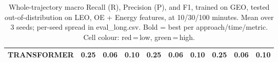 \begin{table}[t]
{\begin{tabular}{l ccc ccc ccc}
\textbf{TRANSFORMER} & \cellcolor[HTML]{FF6B6B}0.25 & \cellcolor[HTML]{FF6B6B}0.06 & \cellcolor[HTML]{FF6B6B}0.10 & \cellcolor[HTML]{FF6B6B}0.25 & \cellcolor[HTML]{FF6B6B}0.06 & \cellcolor[HTML]{FF6B6B}0.10 & \cellcolor[HTML]{FF6B6B}0.25 & \cellcolor[HTML]{FF6B6B}0.06 & \cellcolor[HTML]{FF6B6B}0.10 \\
\bottomrule
\end{tabular}%
}
\caption{Whole-trajectory macro Recall (R), Precision (P), and F1, trained on GEO, tested out-of-distribution on LEO, OE + Energy features, at 10/30/100 minutes. Mean over 3 seeds; per-seed spread in eval\_long.csv. Bold = best per approach/time/metric. Cell colour: red\,=\,low, green\,=\,high.}
\label{tab:total_geo_to_leo_phys}
\end{table}
